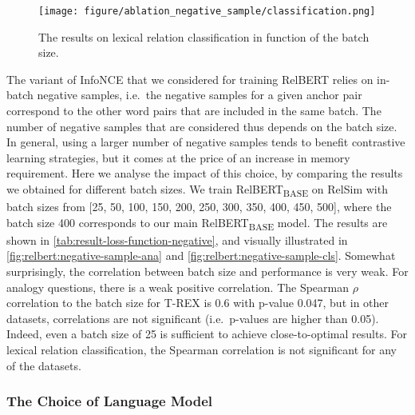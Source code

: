 \documentclass[3p]{elsarticle}
\begin{document}
{\begin{figure}[!ht]
    \centering
    \texttt{[image: figure/ablation\_negative\_sample/classification.png]}
    \caption{The results on lexical relation classification in function of the batch size. }
    \label{fig:relbert:negative-sample-cls}
\end{figure}

The variant of InfoNCE that we considered for training RelBERT relies on in-batch negative samples, i.e.\ the negative samples for a given anchor pair correspond to the other word pairs that are included in the same batch. The number of negative samples that are considered thus depends on the batch size. In general, using a larger number of negative samples tends to benefit contrastive learning strategies, but it comes at the price of an increase in memory requirement. Here we analyse the impact of this choice, by comparing the results we obtained for different batch sizes. We train RelBERT\textsubscript{BASE} on RelSim with batch sizes from [25, 50, 100, 150, 200, 250, 300, 350, 400, 450, 500], where the batch size 400 corresponds to our main RelBERT\textsubscript{BASE} model. The results are shown in  \autoref{tab:result-loss-function-negative}, and visually illustrated in \autoref{fig:relbert:negative-sample-ana} and \autoref{fig:relbert:negative-sample-cls}.
Somewhat surprisingly, the correlation between batch size and performance is very weak. For analogy questions, there is a weak positive correlation. The Spearman $\rho$ correlation to the batch size for T-REX is 0.6 with p-value 0.047, but in other datasets, correlations are not significant (i.e.\ p-values are higher than 0.05). Indeed, even a batch size of 25 is sufficient to achieve close-to-optimal results. For lexical relation classification, the Spearman correlation is not significant for any of the datasets.

\subsubsection{The Choice of Language Model} \label{sec:relbert:the-choice-of-language-model}

}
\end{document}
